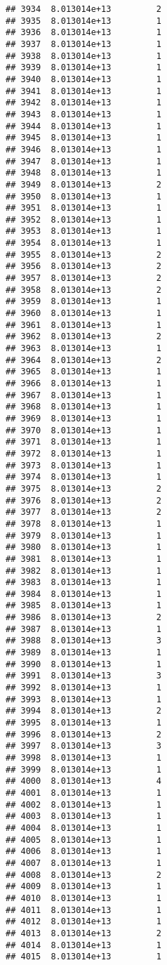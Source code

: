 \documentclass[
]{article}
\begin{document}
\begin{verbatim}
## 3934  8.013014e+13         2
## 3935  8.013014e+13         1
## 3936  8.013014e+13         1
## 3937  8.013014e+13         1
## 3938  8.013014e+13         1
## 3939  8.013014e+13         1
## 3940  8.013014e+13         1
## 3941  8.013014e+13         1
## 3942  8.013014e+13         1
## 3943  8.013014e+13         1
## 3944  8.013014e+13         1
## 3945  8.013014e+13         1
## 3946  8.013014e+13         1
## 3947  8.013014e+13         1
## 3948  8.013014e+13         1
## 3949  8.013014e+13         2
## 3950  8.013014e+13         1
## 3951  8.013014e+13         1
## 3952  8.013014e+13         1
## 3953  8.013014e+13         1
## 3954  8.013014e+13         1
## 3955  8.013014e+13         2
## 3956  8.013014e+13         2
## 3957  8.013014e+13         2
## 3958  8.013014e+13         2
## 3959  8.013014e+13         1
## 3960  8.013014e+13         1
## 3961  8.013014e+13         1
## 3962  8.013014e+13         2
## 3963  8.013014e+13         1
## 3964  8.013014e+13         2
## 3965  8.013014e+13         1
## 3966  8.013014e+13         1
## 3967  8.013014e+13         1
## 3968  8.013014e+13         1
## 3969  8.013014e+13         1
## 3970  8.013014e+13         1
## 3971  8.013014e+13         1
## 3972  8.013014e+13         1
## 3973  8.013014e+13         1
## 3974  8.013014e+13         1
## 3975  8.013014e+13         2
## 3976  8.013014e+13         2
## 3977  8.013014e+13         2
## 3978  8.013014e+13         1
## 3979  8.013014e+13         1
## 3980  8.013014e+13         1
## 3981  8.013014e+13         1
## 3982  8.013014e+13         1
## 3983  8.013014e+13         1
## 3984  8.013014e+13         1
## 3985  8.013014e+13         1
## 3986  8.013014e+13         2
## 3987  8.013014e+13         1
## 3988  8.013014e+13         3
## 3989  8.013014e+13         1
## 3990  8.013014e+13         1
## 3991  8.013014e+13         3
## 3992  8.013014e+13         1
## 3993  8.013014e+13         1
## 3994  8.013014e+13         2
## 3995  8.013014e+13         1
## 3996  8.013014e+13         2
## 3997  8.013014e+13         3
## 3998  8.013014e+13         1
## 3999  8.013014e+13         1
## 4000  8.013014e+13         4
## 4001  8.013014e+13         1
## 4002  8.013014e+13         1
## 4003  8.013014e+13         1
## 4004  8.013014e+13         1
## 4005  8.013014e+13         1
## 4006  8.013014e+13         1
## 4007  8.013014e+13         1
## 4008  8.013014e+13         2
## 4009  8.013014e+13         1
## 4010  8.013014e+13         1
## 4011  8.013014e+13         1
## 4012  8.013014e+13         1
## 4013  8.013014e+13         2
## 4014  8.013014e+13         1
## 4015  8.013014e+13         1

\end{verbatim}
\end{document}
